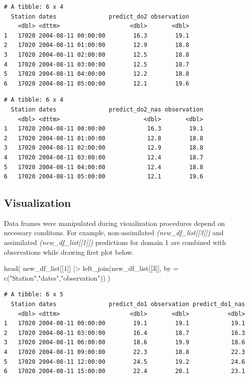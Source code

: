 \documentclass[
  letterpaper,
  DIV=11,
  numbers=noendperiod,
  abstract]{scrartcl}
\newenvironment{Shaded}{\begin{snugshade}}{\end{snugshade}}
\newcommand{\AttributeTok}[1]{\textcolor[rgb]{0.40,0.45,0.13}{#1}}
\newcommand{\DecValTok}[1]{\textcolor[rgb]{0.68,0.00,0.00}{#1}}
\newcommand{\FunctionTok}[1]{\textcolor[rgb]{0.28,0.35,0.67}{#1}}
\newcommand{\NormalTok}[1]{\textcolor[rgb]{0.00,0.23,0.31}{#1}}
\newcommand{\SpecialCharTok}[1]{\textcolor[rgb]{0.37,0.37,0.37}{#1}}
\newcommand{\StringTok}[1]{\textcolor[rgb]{0.13,0.47,0.30}{#1}}
\begin{document}
\begin{verbatim}
# A tibble: 6 x 4
  Station dates               predict_do2 observation
    <dbl> <dttm>                    <dbl>       <dbl>
1   17020 2004-08-11 00:00:00        16.3        19.1
2   17020 2004-08-11 01:00:00        12.9        18.8
3   17020 2004-08-11 02:00:00        12.5        18.8
4   17020 2004-08-11 03:00:00        12.5        18.7
5   17020 2004-08-11 04:00:00        12.2        18.8
6   17020 2004-08-11 05:00:00        12.1        19.6
\end{verbatim}

\begin{verbatim}
# A tibble: 6 x 4
  Station dates               predict_do2_nas observation
    <dbl> <dttm>                        <dbl>       <dbl>
1   17020 2004-08-11 00:00:00            16.3        19.1
2   17020 2004-08-11 01:00:00            12.8        18.8
3   17020 2004-08-11 02:00:00            12.9        18.8
4   17020 2004-08-11 03:00:00            12.4        18.7
5   17020 2004-08-11 04:00:00            12.4        18.8
6   17020 2004-08-11 05:00:00            12.1        19.6
\end{verbatim}

\hypertarget{visualization}{%
\subsection{Visualization}\label{visualization}}

Data frames were manipulated during visualization procedures depend on
necessary conditons. For example, non-assimilated
\emph{(new\_df\_list{[}{[}3{]}{]})} and assimilated
\emph{(new\_df\_list{[}{[}1{]}{]})} predictions for domain 1 are
combined with observations while drawing first plot below.

\begin{Shaded}
\begin{Highlighting}[]
\FunctionTok{head}\NormalTok{(}
\NormalTok{  new\_df\_list[[}\DecValTok{1}\NormalTok{]] }\SpecialCharTok{|\textgreater{}}        
    \FunctionTok{left\_join}\NormalTok{(new\_df\_list[[}\DecValTok{3}\NormalTok{]], }\AttributeTok{by =} \FunctionTok{c}\NormalTok{(}\StringTok{"Station"}\NormalTok{,}\StringTok{"dates"}\NormalTok{,}\StringTok{"observation"}\NormalTok{)) )}
\end{Highlighting}
\end{Shaded}

\begin{verbatim}
# A tibble: 6 x 5
  Station dates               predict_do1 observation predict_do1_nas
    <dbl> <dttm>                    <dbl>       <dbl>           <dbl>
1   17020 2004-08-11 00:00:00        19.1        19.1            19.1
2   17020 2004-08-11 03:00:00        16.4        18.7            16.3
3   17020 2004-08-11 06:00:00        18.6        19.9            18.6
4   17020 2004-08-11 09:00:00        22.3        18.8            22.3
5   17020 2004-08-11 12:00:00        24.5        19.2            24.6
6   17020 2004-08-11 15:00:00        22.4        20.1            23.1
\end{verbatim}
\end{document}
